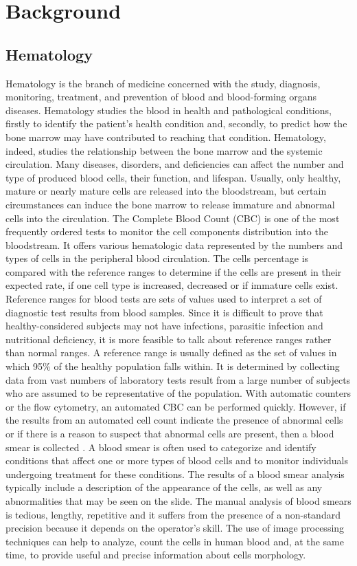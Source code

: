 \chapter{Background}
\section{Hematology} %
Hematology is the branch of medicine concerned with the study, diagnosis, monitoring, treatment, and prevention of blood and blood-forming organs diseases. Hematology studies the blood in health and pathological conditions, firstly to identify the patient's health condition and, secondly, to predict how the bone marrow may have contributed to reaching that condition. 
Hematology, indeed, studies the relationship between the bone marrow and the systemic circulation. Many diseases, disorders, and deficiencies can affect the number and type of produced blood cells, their function, and lifespan. Usually, only healthy, mature or nearly mature cells are released into the bloodstream, but certain circumstances can induce the bone marrow to release immature and abnormal cells into the circulation. The Complete Blood Count (CBC) is one of the most frequently ordered tests to monitor the cell components distribution into the bloodstream. It offers various hematologic data represented by the numbers and types of cells in the peripheral blood circulation. The cells percentage is compared with the reference ranges to determine if the cells are present in their expected rate, if one cell type is increased, decreased or if immature cells exist. Reference ranges for blood tests are sets of values used to interpret a set of diagnostic test results from blood samples. Since it is difficult to prove that healthy-considered subjects may not have infections, parasitic infection and nutritional deficiency, it is more feasible to talk about reference ranges rather than normal ranges. A reference range is usually defined as the set of values in which 95\% of the healthy population falls within. It is determined by collecting data from vast numbers of laboratory tests result from a large number of subjects who are assumed to be representative of the population. With automatic counters or the flow cytometry, an automated CBC can be performed quickly. However, if the results from an automated cell count indicate the presence of abnormal cells or if there is a reason to suspect that abnormal cells are present, then a blood smear is collected \cite{Loddo2016}. A blood smear is often used to categorize and identify conditions that affect one or more types of blood cells and to monitor individuals undergoing treatment for these conditions. The results of a blood smear analysis typically include a description of the appearance of the cells, as well as any abnormalities that may be seen on the slide. The manual analysis of blood smears is tedious, lengthy, repetitive and it suffers from the presence of a non-standard precision because it depends on the operator's skill. The use of image processing techniques can help to analyze, count the cells in human blood and, at the same time, to provide useful and precise information about cells morphology.
